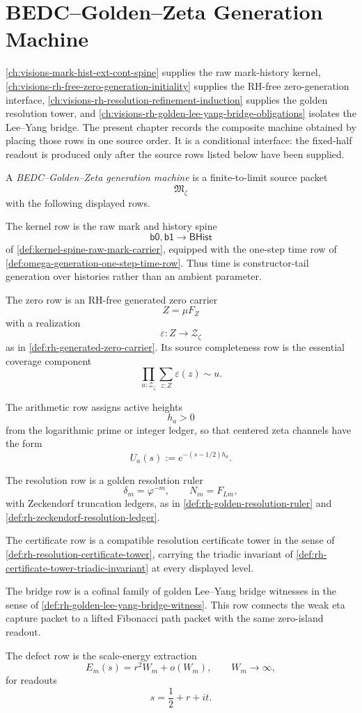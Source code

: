 \chapter{BEDC--Golden--Zeta Generation Machine}
\label{ch:visions-rh-bedc-golden-zeta-generation-machine}

\autoref{ch:visions-mark-hist-ext-cont-spine} supplies the raw
mark-history kernel, \autoref{ch:visions-rh-free-zero-generation-initiality}
supplies the RH-free zero-generation interface,
\autoref{ch:visions-rh-resolution-refinement-induction} supplies the
golden resolution tower, and
\autoref{ch:visions-rh-golden-lee-yang-bridge-obligations} isolates the
Lee--Yang bridge.  The present chapter records the composite machine
obtained by placing those rows in one source order.  It is a conditional
interface: the fixed-half readout is produced only after the source rows
listed below have been supplied.

\begin{definition}
\label{def:rh-bedc-golden-zeta-generation-machine}
A \emph{BEDC--Golden--Zeta generation machine} is a finite-to-limit
source packet
$$
\mathfrak M_{\zeta}
$$
with the following displayed rows.

The kernel row is the raw mark and history spine
$$
\mathsf{b0},\mathsf{b1}
\longrightarrow
\mathsf{BHist}
$$
of \autoref{def:kernel-spine-raw-mark-carrier}, equipped with the
one-step time row of \autoref{def:omega-generation-one-step-time-row}.
Thus time is constructor-tail generation over histories rather than an
ambient parameter.

The zero row is an RH-free generated zero carrier
$$
Z=\mu F_Z
$$
with a realization
$$
\varepsilon:Z\to\mathcal Z_{\zeta}
$$
as in \autoref{def:rh-generated-zero-carrier}.  Its source
completeness row is the essential coverage component
$$
\prod_{u:\mathcal Z_{\zeta}}
\sum_{z:Z}\varepsilon(z)\sim u.
$$

The arithmetic row assigns active heights
$$
h_a>0
$$
from the logarithmic prime or integer ledger, so that centered zeta
channels have the form
$$
U_a(s):=e^{-(s-1/2)h_a}.
$$

The resolution row is a golden resolution ruler
$$
\delta_m=\varphi^{-m},
\qquad
N_m=F_{Lm},
$$
with Zeckendorf truncation ledgers, as in
\autoref{def:rh-golden-resolution-ruler} and
\autoref{def:rh-zeckendorf-resolution-ledger}.

The certificate row is a compatible resolution certificate tower in the
sense of \autoref{def:rh-resolution-certificate-tower}, carrying the
triadic invariant of \autoref{def:rh-certificate-tower-triadic-invariant}
at every displayed level.

The bridge row is a cofinal family of golden Lee--Yang bridge witnesses
in the sense of \autoref{def:rh-golden-lee-yang-bridge-witness}.  This
row connects the weak eta capture packet to a lifted Fibonacci path
packet with the same zero-island readout.

The defect row is the scale-energy extraction
$$
E_m(s)=r^2W_m+o(W_m),
\qquad
W_m\to\infty,
$$
for readouts
$$
s=\frac12+r+it.
$$
\end{definition}

